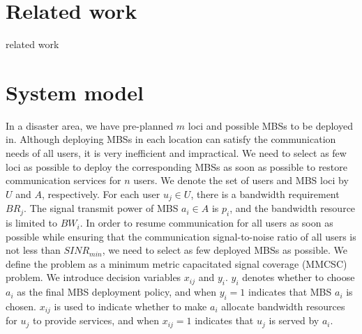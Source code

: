 \documentclass[11pt,a4paper]{article}
\begin{document}
\section{Related work}
 related work
\section{System model}
In a disaster area, we have pre-planned $m$ loci and possible MBSs to be deployed in. Although deploying MBSs in each location can satisfy the communication needs of all users, it is very inefficient and impractical. We need to select as few loci as possible to deploy the corresponding MBSs as soon as possible to restore communication services for $n$ users. We denote the set of users and MBS loci by $U$ and $A$, respectively. For each user $u_j \in U$, there is a bandwidth requirement $BR_j$. The signal transmit power of MBS $a_i \in A$ is $p_i$, and the bandwidth resource is limited to $BW_i$. 
In order to resume communication for all users as soon as possible while ensuring that the communication signal-to-noise ratio of all users is not less than $SINR_{min}$, we need to select as few deployed MBSs as possible.
We define the problem as a minimum metric capacitated signal coverage (MMCSC) problem.
We introduce decision variables $x_{ij}$ and $y_i$. $y_i$ denotes whether to choose $a_i$ as the final MBS deployment policy, and when $y_i=1$ indicates that MBS $a_i$ is chosen. $x_{ij}$ is used to indicate whether to make $a_i$ allocate bandwidth resources for $u_j$ to provide services, and when $x_{ij}=1$ indicates that $u_j$ is served by $a_i$.
\end{document}
